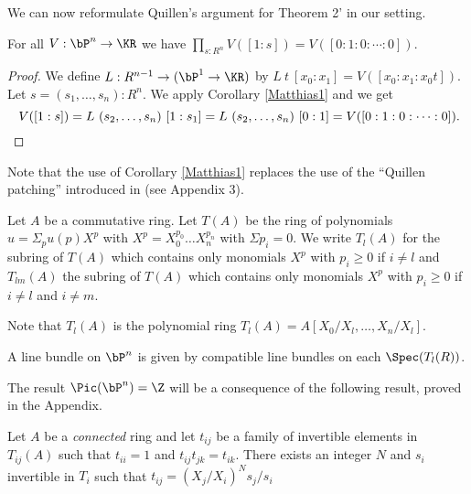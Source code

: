 We can now reformulate Quillen's argument for Theorem 2' \cite{Quillen} in our setting.

\begin{proposition}\label{trivial}
  For all $V:\bP^n\rightarrow \KR$ we have ${\prod_{s:R^n}V([1:s]) = V([0:1:0:\cdots :0])}$.
\end{proposition}

\begin{proof}
  We define $L:R^{n-1}\rightarrow (\bP^1 \to \KR)$ by $L~t~[x_0:x_1] = V([x_0:x_1:x_0t])$.
  Let $s=(s_1,\dots,s_{n}):R^{n}$. We apply Corollary \ref{Matthias1} and we get
  \[
   V([1:s]) = L~(s_2,\dots,s_n)~[1:s_1] = L~(s_2,\dots,s_n)~[0:1] = V([0:1:0:\cdots :0])
   \rlap{.}
  \]
\end{proof}

 Note that the use of Corollary \ref{Matthias1} replaces the use of the ``Quillen patching''
 \cite{lombardi-quitte} introduced in \cite{Quillen} (see Appendix 3).

\medskip

Let $A$ be a commutative ring.
Let $T(A)$ be the ring of polynomials $u = \Sigma_p u(p)X^p$ with
$X^p = X_0^{p_0}\dots X_n^{p_n}$ with $\Sigma p_i = 0$. We write $T_l(A)$ for the subring
of $T(A)$ which contains only monomials $X^p$ with $p_i\geqslant 0$ if $i\neq l$
and $T_{lm}(A)$ the subring of $T(A)$ 
which contains only monomials $X^p$ with $p_i\geqslant 0$ if $i\neq l$ and $i\neq m$.

Note that $T_l(A)$ is the polynomial ring $T_l(A) = A[X_0/X_l,\dots,X_n/X_l]$.

A line bundle on $\bP^n$ is given by compatible line bundles on each $\Spec(T_l(R))$.

The result $\Pic(\bP^n) = \Z$ will be a consequence of the following result, proved in the Appendix.

\begin{proposition}\label{units}
  Let $A$ be a {\em connected} ring and let $t_{ij}$ be a family of  invertible elements in $T_{ij}(A)$ such that $t_{ii} = 1$
  and $t_{ij}t_{jk} = t_{ik}$. There exists an integer $N$ and $s_i$ invertible in $T_i$ such that $t_{ij} = (X_j/X_i)^Ns_j/s_i$ 
\end{proposition}






